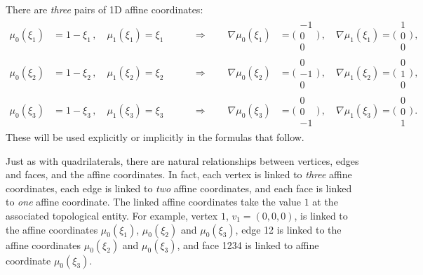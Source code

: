 There are \textit{three} pairs of 1D affine coordinates:
\begin{equation}
	\begin{alignedat}{4}
		\mu_0(\xi_1)&=1-\xi_1\,,\quad \mu_1(\xi_1)=\xi_1\,\qquad&\Rightarrow\qquad
			\nabla\mu_0(\xi_1)&=\bigg(\begin{smallmatrix}-1\\[2pt]0\\[2pt]0\end{smallmatrix}\bigg)\,,\quad
				\nabla\mu_1(\xi_1)=\bigg(\begin{smallmatrix}1\\[2pt]0\\[2pt]0\end{smallmatrix}\bigg)\,,\\
		\mu_0(\xi_2)&=1-\xi_2\,,\quad \mu_1(\xi_2)=\xi_2\,\qquad&\Rightarrow\qquad
			\nabla\mu_0(\xi_2)&=\bigg(\begin{smallmatrix}0\\[2pt]-1\\[2pt]0\end{smallmatrix}\bigg)\,,\quad
				\nabla\mu_1(\xi_2)=\bigg(\begin{smallmatrix}0\\[2pt]1\\[2pt]0\end{smallmatrix}\bigg)\,,\\
		\mu_0(\xi_3)&=1-\xi_3\,,\quad \mu_1(\xi_3)=\xi_3\,\qquad&\Rightarrow\qquad
			\nabla\mu_0(\xi_3)&=\bigg(\begin{smallmatrix}0\\[2pt]0\\[2pt]-1\end{smallmatrix}\bigg)\,,\quad
		\nabla\mu_1(\xi_3)=\bigg(\begin{smallmatrix}0\\[2pt]0\\[2pt]1\end{smallmatrix}\bigg)\,.
	\end{alignedat}
\end{equation}
These will be used explicitly or implicitly in the formulas that follow.

Just as with quadrilaterals, there are natural relationships between vertices, edges and faces, and the affine coordinates.
In fact, each vertex is linked to \textit{three} affine coordinates, each edge is linked to \textit{two} affine coordinates, and each face is linked to \textit{one} affine coordinate.
The linked affine coordinates take the value $1$ at the associated topological entity.
For example, vertex $1$, $v_1=(0,0,0)$, is linked to the affine coordinates $\mu_0(\xi_1)$, $\mu_0(\xi_2)$ and $\mu_0(\xi_3)$, edge 12 is linked to the affine coordinates $\mu_0(\xi_2)$ and $\mu_0(\xi_3)$, and face 1234 is linked to affine coordinate $\mu_0(\xi_3)$.

